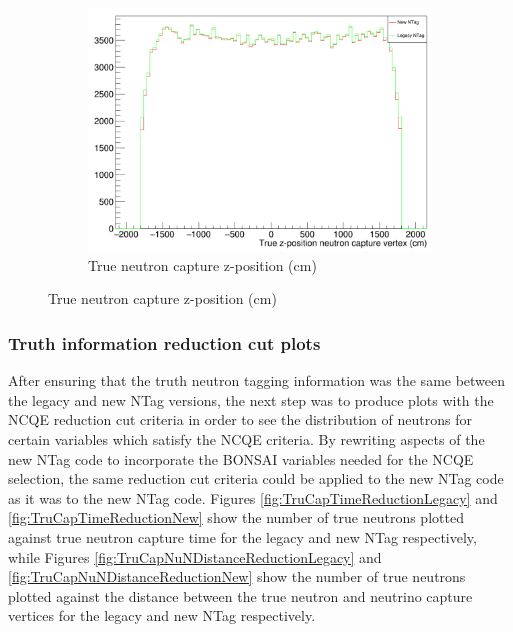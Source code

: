 \begin{figure}
\begin{subfigure}[b]{0.33\linewidth}
      \includegraphics[width=\linewidth]{Figures/TrueNCapZPos.PNG}
      \caption{True neutron capture z-position (cm)}
      \label{fig:TrueNCapZPos}
      \end{subfigure}
\end{figure}

\subsubsection{Truth information reduction cut plots}

After ensuring that the truth neutron tagging information was the same between the legacy and new NTag versions, the next step was to produce plots with the NCQE reduction cut criteria in order to see the distribution of neutrons for certain variables which satisfy the NCQE criteria. By rewriting aspects of the new NTag code to incorporate the BONSAI variables needed for the NCQE selection, the same reduction cut criteria could be applied to the new NTag code as it was to the new NTag code. Figures \ref{fig:TruCapTimeReductionLegacy} and \ref{fig:TruCapTimeReductionNew} show the number of true neutrons plotted against true neutron capture time for the legacy and new NTag respectively, while Figures \ref{fig:TruCapNuNDistanceReductionLegacy} and \ref{fig:TruCapNuNDistanceReductionNew} show the number of true neutrons plotted against the distance between the true neutron and neutrino capture vertices for the legacy and new NTag respectively.


